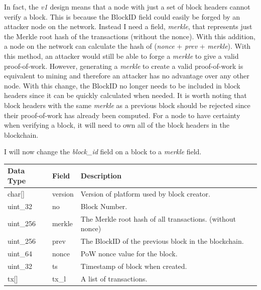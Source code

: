 \documentclass{article}
\begin{document}
In fact, the \textit{v1} design means that a node with just a set of block headers cannot verify a block. This is because the BlockID field could easily be forged by an attacker node on the network. Instead I need a field, \textit{merkle}, that represents just the Merkle root hash of the transactions (without the nonce). With this addition, a node on the network can calculate the hash of (\textit{nonce} + \textit{prev} + \textit{merkle}). With this method, an attacker would still be able to forge a \textit{merkle} to give a valid proof-of-work. However, generating a \textit{merkle} to create a valid proof-of-work is equivalent to mining and therefore an attacker has no advantage over any other node. With this change, the BlockID no longer needs to be included in block headers since it can be quickly calculated when needed. It is worth noting that block headers with the same \textit{merkle} as a previous block should be rejected since their proof-of-work has already been computed. For a node to have certainty when verifying a block, it will need to own all of the block headers in the blockchain.

I will now change the \textit{block\_id} field on a block to a \textit{merkle} field.
\begin{table}[H]
\centering
\begin{tabular}{|p{1.3cm}|p{2.5cm}|p{5.5cm}|}
\hline
\rowcolor{tblgrey} 
Data Type   & Field      & Description                            \\ \hline
char[\hspace{0.05cm}]  & version     & Version of platform used by block creator.          \\ \hline
uint\_32    & no          & Block Number.                                       \\ \hline
uint\_256   & merkle      & The Merkle root hash of all transactions. (without nonce)  \\ \hline
uint\_256   & prev        & The BlockID of the previous block in the blockchain.   \\ \hline
uint\_64    & nonce       & PoW nonce value for the block.                      \\ \hline
uint\_32    & ts          & Timestamp of block when created.                    \\ \hline
tx[\hspace{0.05cm}] & tx\_l       & A list of transactions.                            \\ \hline
\end{tabular}
\end{table}
\end{document}
